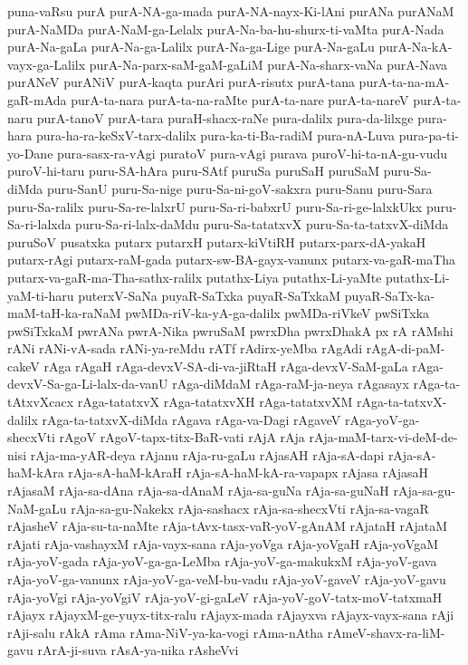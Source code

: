 {puna-vaRsu
purA
purA-NA-ga-mada
purA-NA-nayx-Ki-lAni
purANa
purANaM
purA-NaMDa
purA-NaM-ga-Lelalx
purA-Na-ba-hu-shurx-ti-vaMta
purA-Nada
purA-Na-gaLa
purA-Na-ga-Lalilx
purA-Na-ga-Lige
purA-Na-gaLu
purA-Na-kA-vayx-ga-Lalilx
purA-Na-parx-saM-gaM-gaLiM
purA-Na-sharx-vaNa
purA-Nava
purANeV
purANiV
purA-kaqta
purAri
purA-risutx
purA-tana
purA-ta-na-mA-gaR-mAda
purA-ta-nara
purA-ta-na-raMte
purA-ta-nare
purA-ta-nareV
purA-ta-naru
purA-tanoV
purA-tara
puraH-shacx-raNe
pura-dalilx
pura-da-lilxge
pura-hara
pura-ha-ra-keSxV-tarx-dalilx
pura-ka-ti-Ba-radiM
pura-nA-Luva
pura-pa-ti-yo-Dane
pura-sasx-ra-vAgi
puratoV
pura-vAgi
purava
puroV-hi-ta-nA-gu-vudu
puroV-hi-taru
puru-SA-hAra
puru-SAtf
puruSa
puruSaH
puruSaM
puru-Sa-diMda
puru-SanU
puru-Sa-nige
puru-Sa-ni-goV-sakxra
puru-Sanu
puru-Sara
puru-Sa-ralilx
puru-Sa-re-lalxrU
puru-Sa-ri-babxrU
puru-Sa-ri-ge-lalxkUkx
puru-Sa-ri-lalxda
puru-Sa-ri-lalx-daMdu
puru-Sa-tatatxvX
puru-Sa-ta-tatxvX-diMda
puruSoV
pusatxka
putarx
putarxH
putarx-kiVtiRH
putarx-parx-dA-yakaH
putarx-rAgi
putarx-raM-gada
putarx-sw-BA-gayx-vanunx
putarx-va-gaR-maTha
putarx-va-gaR-ma-Tha-sathx-ralilx
putathx-Liya
putathx-Li-yaMte
putathx-Li-yaM-ti-haru
puterxV-SaNa
puyaR-SaTxka
puyaR-SaTxkaM
puyaR-SaTx-ka-maM-taH-ka-raNaM
pwMDa-riV-ka-yA-ga-dalilx
pwMDa-riVkeV
pwSiTxka
pwSiTxkaM
pwrANa
pwrA-Nika
pwruSaM
pwrxDha
pwrxDhakA
px
rA
rAMshi
rANi
rANi-vA-sada
rANi-ya-reMdu
rATf
rAdirx-yeMba
rAgAdi
rAgA-di-paM-cakeV
rAga
rAgaH
rAga-devxV-SA-di-va-jiRtaH
rAga-devxV-SaM-gaLa
rAga-devxV-Sa-ga-Li-lalx-da-vanU
rAga-diMdaM
rAga-raM-ja-neya
rAgasayx
rAga-ta-tAtxvXcacx
rAga-tatatxvX
rAga-tatatxvXH
rAga-tatatxvXM
rAga-ta-tatxvX-dalilx
rAga-ta-tatxvX-diMda
rAgava
rAga-va-Dagi
rAgaveV
rAga-yoV-ga-shecxVti
rAgoV
rAgoV-tapx-titx-BaR-vati
rAjA
rAja
rAja-maM-tarx-vi-deM-de-nisi
rAja-ma-yAR-deya
rAjanu
rAja-ru-gaLu
rAjasAH
rAja-sA-dapi
rAja-sA-haM-kAra
rAja-sA-haM-kAraH
rAja-sA-haM-kA-ra-vapapx
rAjasa
rAjasaH
rAjasaM
rAja-sa-dAna
rAja-sa-dAnaM
rAja-sa-guNa
rAja-sa-guNaH
rAja-sa-gu-NaM-gaLu
rAja-sa-gu-Nakekx
rAja-sashacx
rAja-sa-shecxVti
rAja-sa-vagaR
rAjasheV
rAja-su-ta-naMte
rAja-tAvx-tasx-vaR-yoV-gAnAM
rAjataH
rAjataM
rAjati
rAja-vashayxM
rAja-vayx-sana
rAja-yoVga
rAja-yoVgaH
rAja-yoVgaM
rAja-yoV-gada
rAja-yoV-ga-ga-LeMba
rAja-yoV-ga-makukxM
rAja-yoV-gava
rAja-yoV-ga-vanunx
rAja-yoV-ga-veM-bu-vadu
rAja-yoV-gaveV
rAja-yoV-gavu
rAja-yoVgi
rAja-yoVgiV
rAja-yoV-gi-gaLeV
rAja-yoV-goV-tatx-moV-tatxmaH
rAjayx
rAjayxM-ge-yuyx-titx-ralu
rAjayx-mada
rAjayxva
rAjayx-vayx-sana
rAji
rAji-salu
rAkA
rAma
rAma-NiV-ya-ka-vogi
rAma-nAtha
rAmeV-shavx-ra-liM-gavu
rArA-ji-suva
rAsA-ya-nika
rAsheVvi
}
